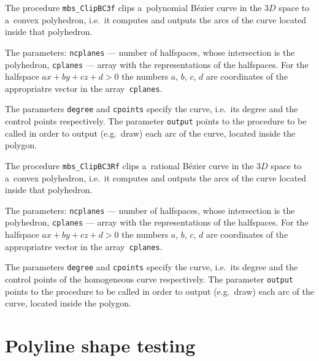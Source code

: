 \vspace{\bigskipamount}
The procedure \texttt{mbs\_ClipBC3f} clips a~polynomial B\'{e}zier
curve in the $3D$ space to a~convex polyhedron, i.e.\ it computes and
outputs the arcs of the curve located inside that polyhedron.

The parameters: \texttt{ncplanes} --- number of halfspaces, whose intersection
is the polyhedron, \texttt{cplanes} --- array with the representations
of the halfspaces. For the halfspace $ax+by+cz+d>0$ the numbers
$a$, $b$, $c$, $d$ are coordinates of the appropriatre vector in the
array~\texttt{cplanes}.

The parameters \texttt{degree} and \texttt{cpoints} specify the curve,
i.e.\ its degree and the control points respectively.
The parameter \texttt{output} points to the procedure to be called in order
to output (e.g.\ draw) each arc of the curve, located inside the polygon.

\vspace{\bigskipamount}
The procedure \texttt{mbs\_ClipBC3Rf} clips a~rational B\'{e}zier
curve in the $3D$ space to a~convex polyhedron, i.e.\ it computes and
outputs the arcs of the curve located inside that polyhedron.

The parameters: \texttt{ncplanes} --- number of halfspaces, whose intersection
is the polyhedron, \texttt{cplanes} --- array with the representations
of the halfspaces. For the halfspace $ax+by+cz+d>0$ the numbers
$a$, $b$, $c$, $d$ are coordinates of the appropriatre vector in the
array~\texttt{cplanes}.

The parameters \texttt{degree} and \texttt{cpoints} specify the curve,
i.e.\ its degree and the control points of the homogeneous curve respectively.
The parameter \texttt{output} points to the procedure to be called in order
to output (e.g.\ draw) each arc of the curve, located inside the polygon.


\newpage
\section{Polyline shape testing}

